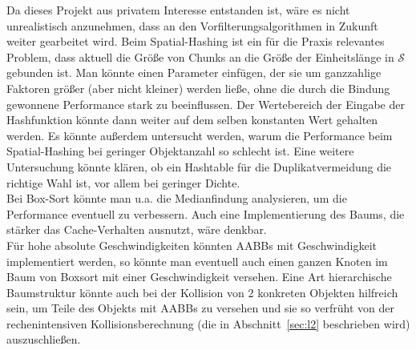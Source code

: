 Da dieses Projekt aus privatem Interesse entstanden ist, wäre es nicht unrealistisch anzunehmen, dass an den Vorfilterungsalgorithmen in Zukunft weiter gearbeitet wird. Beim Spatial-Hashing ist ein für die Praxis relevantes Problem, dass aktuell die Größe von Chunks an die Größe der Einheitslänge in $\mathcal{S}$ gebunden ist. Man könnte einen Parameter einfügen, der sie um ganzzahlige Faktoren größer (aber nicht kleiner) werden ließe, ohne die durch die Bindung gewonnene Performance stark zu beeinflussen. Der Wertebereich der Eingabe der Hashfunktion könnte dann weiter auf dem selben konstanten Wert gehalten werden. Es könnte außerdem untersucht werden, warum die Performance beim Spatial-Hashing bei geringer Objektanzahl so schlecht ist. Eine weitere Untersuchung könnte klären, ob ein Hashtable für die Duplikatvermeidung die richtige Wahl ist, vor allem bei geringer Dichte.\\
Bei Box-Sort könnte man u.a. die Medianfindung analysieren, um die Performance eventuell zu verbessern. Auch eine Implementierung des Baums, die stärker das Cache-Verhalten ausnutzt, wäre denkbar.\\
Für hohe absolute Geschwindigkeiten könnten AABBs mit Geschwindigkeit implementiert werden, so könnte man eventuell auch einen ganzen Knoten im Baum von Boxsort mit einer Geschwindigkeit versehen. Eine Art hierarchische Baumstruktur könnte auch bei der Kollision von 2 konkreten Objekten hilfreich sein, um Teile des Objekts mit AABBs zu versehen und sie so verfrüht von der rechenintensiven Kollisionsberechnung (die in Abschnitt~\ref{sec:l2} beschrieben wird) auszuschließen.\\

